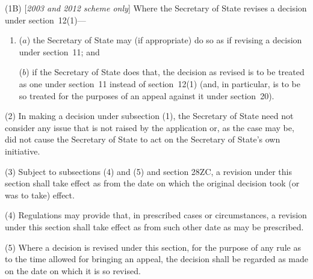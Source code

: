 \documentclass[12pt,a4paper]{article}
\begin{document}
(1B) [\emph{2003 and 2012 scheme only}] Where the 
Secretary of State  %
revises a decision under section~12(1)—
\begin{enumerate}\item[]
($a$) 
the Secretary of State  %
may (if appropriate) do so as if 
revising a decision under section~11; and

($b$) if 
the Secretary of State  %
does that, 
the  %
decision as revised is to be treated as one under section~11 instead of section~12(1)  (and, in particular, is to be so treated for the purposes of an appeal against it under section~20).
\end{enumerate}

(2) In making a decision under subsection (1), the 
Secretary of State  %
need not consider any issue that is not raised by the application or, as the case may be, did not cause 
the Secretary of State  %
to act on 
the Secretary of State's  %
own initiative.

(3) Subject to subsections (4) and (5) and section 28ZC, a revision under this section shall take effect as from the date on which the original decision took (or was to take) effect.

(4) Regulations may provide that, in prescribed cases or circumstances, a revision under this section shall take effect as from such other date as may be prescribed.

(5) Where a decision is revised under this section, for the purpose of any rule as to the time allowed for bringing an appeal, the decision shall be regarded as made on the date on which it is so revised.
\end{document}
